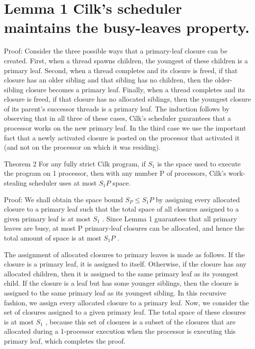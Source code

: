 \documentclass[
]{article}
\begin{document}
\section{Lemma 1 Cilk's scheduler maintains the busy-leaves
property.}\label{lemma-1-cilks-scheduler-maintains-the-busy-leaves-property.}

Proof: Consider the three possible ways that a primary-leaf closure can
be created. First, when a thread spawns children, the youngest of these
children is a primary leaf. Second, when a thread completes and its
closure is freed, if that closure has an older sibling and that sibling
has no children, then the older-sibling closure becomes a primary leaf.
Finally, when a thread completes and its closure is freed, if that
closure has no allocated siblings, then the youngest closure of its
parent's successor threads is a primary leaf. The induction follows by
observing that in all three of these cases, Cilk's scheduler guarantees
that a processor works on the new primary leaf. In the third case we use
the important fact that a newly activated closure is posted on the
processor that activated it (and not on the processor on which it was
residing).

Theorem 2 For any fully strict Cilk program, if \(S_{1}\) is the space
used to execute the program on 1 processor, then with any number P of
processors, Cilk's work-stealing scheduler uses at most \(S_{1}P\)
space.

Proof: We shall obtain the space bound \(S_{P} \leq S_{1}P\) by
assigning every allocated closure to a primary leaf such that the total
space of all closures assigned to a given primary leaf is at most
\(S_{1}\) . Since Lemma 1 guarantees that all primary leaves are busy,
at most P primary-leaf closures can be allocated, and hence the total
amount of space is at most \(S_{1}P\) .

The assignment of allocated closures to primary leaves is made as
follows. If the closure is a primary leaf, it is assigned to itself.
Otherwise, if the closure has any allocated children, then it is
assigned to the same primary leaf as its youngest child. If the closure
is a leaf but has some younger siblings, then the closure is assigned to
the same primary leaf as its youngest sibling. In this recursive
fashion, we assign every allocated closure to a primary leaf. Now, we
consider the set of closures assigned to a given primary leaf. The total
space of these closures is at most \(S_{1}\) , because this set of
closures is a subset of the closures that are allocated during a
1-processor execution when the processor is executing this primary leaf,
which completes the proof.
\end{document}
